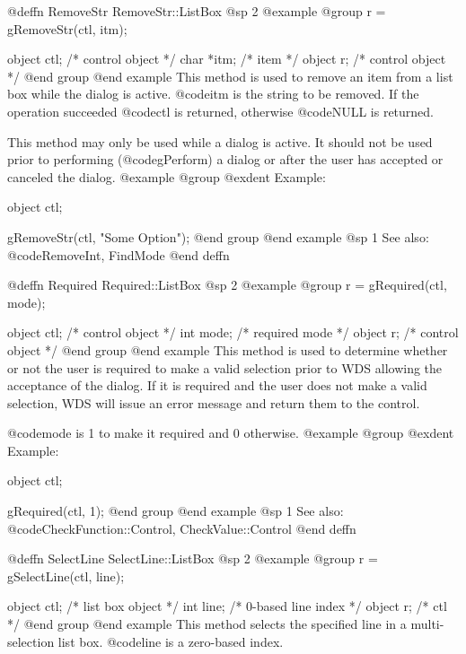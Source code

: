 {@deffn {RemoveStr} RemoveStr::ListBox
@sp 2
@example
@group
r = gRemoveStr(ctl, itm);

object  ctl;    /*  control object  */
char   *itm;    /*  item            */
object  r;      /*  control object  */
@end group
@end example
This method is used to remove an item from a list box while the dialog
is active.  @code{itm} is the string to be removed.
If the operation succeeded @code{ctl} is returned, otherwise @code{NULL}
is returned.

This method may only be used while a dialog is active.  It should not be
used prior to performing (@code{gPerform}) a dialog or after the user
has accepted or canceled the dialog.
@example
@group
@exdent Example:

object  ctl;

gRemoveStr(ctl, "Some Option");
@end group
@end example
@sp 1
See also:  @code{RemoveInt, FindMode}
@end deffn















@deffn {Required} Required::ListBox
@sp 2
@example
@group
r = gRequired(ctl, mode);

object  ctl;    /*  control object  */
int     mode;   /*  required mode   */
object  r;      /*  control object  */
@end group
@end example
This method is used to determine whether or not the user is required to
make a valid selection prior to WDS allowing the acceptance of the dialog.
If it is required and the user does not make a valid selection, WDS
will issue an error message and return them to the control.

@code{mode} is 1 to make it required and 0 otherwise.
@example
@group
@exdent Example:

object  ctl;

gRequired(ctl, 1);
@end group
@end example
@sp 1
See also:  @code{CheckFunction::Control, CheckValue::Control}
@end deffn



@deffn {SelectLine} SelectLine::ListBox
@sp 2
@example
@group
r = gSelectLine(ctl, line);

object  ctl;    /*  list box object  */
int     line;   /*  0-based line index  */
object  r;      /*  ctl              */
@end group
@end example
This method selects the specified line in a multi-selection list box.
@code{line} is a zero-based index.

}
